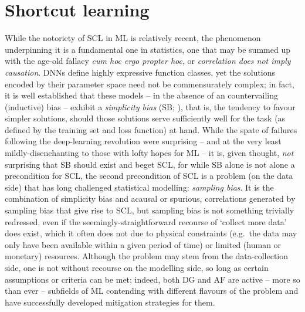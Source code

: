 \section{Shortcut learning}\label{sec:shortcut-learning}
%
%
While the notoriety of \acf{SCL} in \ac{ML} is relatively recent, the phenomenon
underpinning it is a fundamental one in statistics, one that may be summed up with the age-old
fallacy \emph{cum hoc ergo propter hoc}, or \emph{correlation does not imply causation}.
%
%
\Acp{DNN} define highly expressive function classes, yet the solutions encoded by their parameter
space need not be commensurately complex; in fact, it is well established that these models -- in
the absence of an countervailing (inductive) bias -- exhibit a \emph{simplicity bias} (SB;
\citealp{valle2018deep}), that is, the tendency to favour simpler solutions, should those solutions
serve sufficiently well for the task (as defined by the training set and loss function) at hand.
%
While the spate of failures following the deep-learning revolution were surprising -- and at the
very least mildly-disenchanting to those with lofty hopes for \ac{ML} -- it is, given thought,
\emph{not} surprising that SB should exist and beget \ac{SCL}, for while SB alone is not alone a
precondition for \ac{SCL}, the second precondition  of \ac{SCL} is a problem (on the data side)
that has long challenged statistical modelling: \emph{sampling bias}.
%
It is the combination of simplicity bias and acausal or spurious, correlations generated by
sampling bias that give rise to \ac{SCL}, but sampling bias is not something trivially redressed,
even if the seemingly-straightforward recourse of `collect more data' does exist, which it often
does not due to physical constraints (e.g.\ the data may only have been available within a given
period of time) or limited (human or monetary) resources.
%
Although the problem may stem from the data-collection side, one is not without recourse on the
modelling side, so long as certain assumptions or criteria can be met;
%
indeed, both \ac{DG} and \ac{AF} are active -- more so than ever -- subfields of \ac{ML} contending with
different flavours of the problem and have successfully developed mitigation strategies for them.

